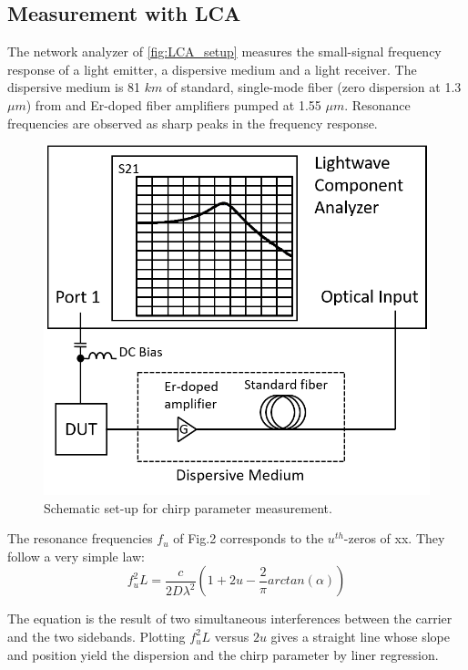 \subsection{Measurement with LCA}\label{subsec:measurement_with_LCA}
The network analyzer of \autoref{fig:LCA_setup} measures the small-signal frequency response of a light emitter, a dispersive medium and a light receiver. The dispersive medium is 81 $km$ of standard, single-mode fiber (zero dispersion at 1.3 $\mu m$) from and Er-doped fiber amplifiers pumped at 1.55 $\mu m$. Resonance frequencies are observed as sharp peaks in the frequency response.
\begin{figure}[ht]
    \centering
    \includegraphics[width=.5\linewidth]{figures/LCA_setup.png}
    \caption{Schematic set-up for chirp parameter measurement.}
    \label{fig:LCA_setup}
\end{figure}

The resonance frequencies $f_u$ of Fig.2 corresponds to the $u^{th}$-zeros of xx. They follow a very simple law:
\begin{equation}
    f_u^2L=\frac{c}{2D\lambda ^2}(1+2u-\frac{2}{\pi}arctan(\alpha))
    \label{eq:LCA_equation}
\end{equation}

The equation is the result of two simultaneous interferences between the carrier and the two sidebands. Plotting $f_u^2L$ versus $2u$ gives a straight line whose slope and position yield the dispersion and the chirp parameter by liner regression.

